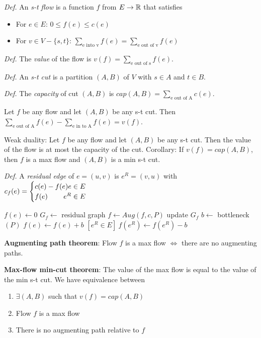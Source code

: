 \textit{Def.} An \textit{s-t flow} is a function $f$ from $E \to \mathbb{R}$ that satisfies
\begin{itemize}
\item For $e \in E$: $0 \leq f(e) \leq c(e)$
\item For $v \in V - \{s,t\}$: $\displaystyle\sum_{\text{e into v}} f(e) = \displaystyle\sum_{\text{e out of v}} f(e)$	
\end{itemize}
\textit{Def.} The \textit{value} of the flow is $v(f) = \displaystyle\sum_{\text{e out of s}} f(e)$. 

\textit{Def.} An \textit{s-t cut} is a partition $(A,B)$ of $V$ with $s \in A$ and $t \in B$.

\textit{Def.} The \textit{capacity} of cut $(A,B)$ is $cap(A,B) = \displaystyle\sum_{\text{e out of A}} c(e)$. 

Let $f$ be any flow and let $(A,B)$ be any s-t cut. Then $\displaystyle\sum_{\text{e out of A}} f(e) - \displaystyle\sum_{\text{e in to A}} f(e) = v(f)$. 

Weak duality: Let $f$ be any flow and let $(A,B)$ be any s-t cut. Then the value of the flow is at most the capacity of the cut. 
Corollary: If $v(f) = cap(A,B)$, then $f$ is a max flow and $(A,B)$ is a min s-t cut. 

\textit{Def.} A \textit{residual edge} of $e = (u,v)$ is $e^R = (v,u)$ with $c_f(e) = \begin{cases}
 c(e) - f(e) \hfill e \in E \\
 f(e) \hfill e^R \in E
 \end{cases}$

\begin{algorithm}[H]
\begin{algorithmic}[1]
 $f(e) \gets 0$
\EndFor
\State $G_f \gets $ residual graph
\State $f \gets Aug(f, c, P)$
\State update $G_f$
\EndWhile
\State {}
\EndProcedure
{}
\State $b \gets$ bottleneck$(P)$
 $f(e) \gets f(e) + b$
\Else $[e^R \in E]\ f(e^R) \gets f(e^R) - b$
\EndIf
\EndFor
\State {}
\EndProcedure
\end{algorithmic}
\end{algorithm}

\textbf{Augmenting path theorem}: Flow $f$ is a max flow $\iff$ there are no augmenting paths. 

\textbf{Max-flow min-cut theorem}: The value of the max flow is equal to the value of the min s-t cut. We have equivalence between
\begin{enumerate}
\item $\exists (A,B)$ such that $v(f) = cap(A,B)$
\item Flow $f$ is a max flow
\item There is no augmenting path relative to $f$	
\end{enumerate}


